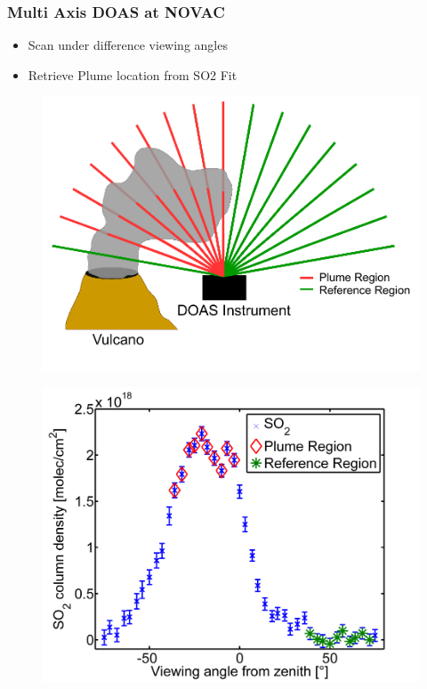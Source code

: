 \documentclass[aspectratio=169]{beamer} %
\begin{document}
	\begin{frame}
\frametitle{\color{mygreen}Multi Axis DOAS at NOVAC\\%
	\color{mygreen}{\rule{0.8\textwidth}{2pt}}}

\vspace{-1cm}
\begin{block}{}
	\begin{multicols}{2}
		\begin{itemize}
			\item Scan under difference viewing angles
			\item Retrieve Plume location from SO2 Fit
		\end{itemize}
	\end{multicols}	
\end{block}
\begin{multicols}{2}
	\begin{figure}
		\centering
		\includegraphics[width=1\linewidth]{../../Bilder/ContaminationVis}
		\label{fig:doasfunction}
	\end{figure}
	\begin{figure}
		\centering
		\includegraphics[width=1\linewidth]{../../Bilder/SO2_Scan}
		\label{fig:dddd}
	\end{figure}	
\end{multicols}
\end{frame}
\end{document}
